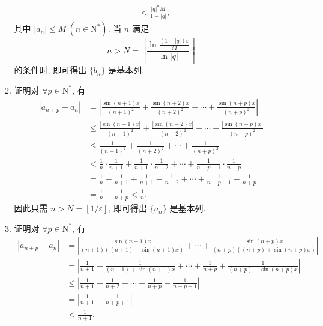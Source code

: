 \documentclass[12pt, a4paper]{article}
\begin{document}
\begin{enumerate}
\begin{enumerate}[(1)]
\begin{align*}
                                    &< \frac{|q|^nM}{1-|q|},
                \end{align*}
                其中 $|a_n| \leqslant M\ (n \in \mathrm{N}^*)$. 当 $n$ 满足
                \[
                    n > N = \left[\frac{\ln\frac{(1-|q|)\varepsilon}{M}}{\ln|q|}\right]    
                \]
                的条件时, 即可得出 $\{b_n\}$ 是基本列.
            \item {\heiti 证明}\quad 对 $\forall p \in \mathrm{N}^*$, 有
                \begin{align*}
                    |a_{n+p} - a_n| &= \left| \frac{\sin(n+1)x}{(n+1)^2} + \frac{\sin(n+2)x}{(n+2)^2} + \cdots + \frac{\sin(n+p)x}{(n+p)^2} \right| \\
                                    &\leqslant \frac{|\sin(n+1)x|}{(n+1)^2} + \frac{|\sin(n+2)x|}{(n+2)^2} + \cdots + \frac{|\sin(n+p)x|}{(n+p)^2} \\
                                    &\leqslant \frac{1}{(n+1)^2} + \frac{1}{(n+2)^2} + \cdots + \frac{1}{(n+p)^2} \\
                                    &< \frac1n \cdot \frac{1}{n+1} + \frac{1}{n+1} \cdot \frac{1}{n+2} + \cdots + \frac{1}{n+p-1} \cdot \frac{1}{n+p} \\
                                    &= \frac1n - \frac{1}{n+1} + \frac{1}{n+1} - \frac{1}{n+2} + \cdots + \frac{1}{n+p-1} - \frac{1}{n+p} \\
                                    &= \frac1n - \frac{1}{n+p} < \frac1n.
                \end{align*}
                因此只需 $n > N = [1/\varepsilon]$, 即可得出 $\{a_n\}$ 是基本列.
            \item {\heiti 证明}\quad 对 $\forall p \in \mathrm{N}^*$, 有
                \begin{align*}
                    |a_{n+p} - a_n| &= \left| \frac{\sin(n+1)x}{(n+1)((n+1) + \sin(n+1)x)} + \cdots + \frac{\sin(n+p)x}{(n+p)((n+p) + \sin(n+p)x)} \right| \\
                                    &= \left| \frac{1}{n+1} - \frac{1}{(n+1) + \sin(n+1)x} + \cdots + \frac{1}{n+p} + \frac{1}{(n+p) + \sin(n+p)x} \right| \\
                                    &\leqslant \left| \frac{1}{n+1} - \frac{1}{n+2} + \cdots + \frac{1}{n+p} - \frac{1}{n+p+1} \right| \\
                                    &= \left| \frac{1}{n+1} - \frac{1}{n+p+1} \right| \\
                                    &< \frac{1}{n+1}.

\end{align*}
\end{enumerate}
\end{enumerate}
\end{document}
